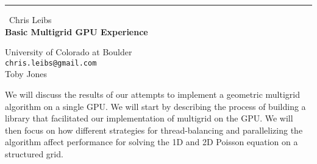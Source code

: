 \documentclass{report}
\begin{document}
\begin{center}
\rule{6in}{1pt} \
{\large Chris Leibs \\
{\bf Basic Multigrid GPU Experience}}

University of Colorado at Boulder
\\
{\tt chris.leibs@gmail.com}\\
Toby Jones\end{center}

We will discuss the results of our attempts to implement a
geometric multigrid algorithm on a single GPU. We will start by describing
the process of building a library that facilitated our implementation of
multigrid on the GPU. We will then focus on how different strategies for
thread-balancing and parallelizing the algorithm affect performance for
solving the 1D and 2D Poisson equation on a structured grid.
\end{document}
